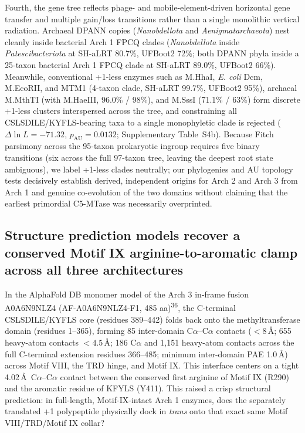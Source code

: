 \documentclass[10pt,letterpaper]{article}
\newcommand{\spname}[1]{\textit{#1}}
\newcommand{\refsup}[1]{\textsuperscript{#1}}
\begin{document}
Fourth, the gene tree reflects phage- and mobile-element-driven horizontal gene transfer and multiple gain/loss transitions rather than a single monolithic vertical radiation. Archaeal DPANN copies (\spname{Nanobdellota} and \spname{Aenigmatarchaeota}) nest cleanly inside bacterial Arch 1 FPCQ clades (\spname{Nanobdellota} inside \spname{Patescibacteriota} at SH-aLRT 80.7\%, UFBoot2 72\%; both DPANN phyla inside a 25-taxon bacterial Arch 1 FPCQ clade at SH-aLRT 89.0\%, UFBoot2 66\%). Meanwhile, conventional +1-less enzymes such as M.HhaI, \spname{E. coli} Dcm, M.EcoRII, and MTM1 (4-taxon clade, SH-aLRT 99.7\%, UFBoot2 95\%), archaeal M.MthTI (with M.HaeIII, 96.0\% / 98\%), and M.SssI (71.1\% / 63\%) form discrete +1-less clusters interspersed across the tree, and constraining all CSLSDILE/KYFLS-bearing taxa to a single monophyletic clade is rejected ($\Delta\ln L = -71.32$, $p_{\mathrm{AU}} = 0.0132$; Supplementary Table~S4b). Because Fitch parsimony across the 95-taxon prokaryotic ingroup requires five binary transitions (six across the full 97-taxon tree, leaving the deepest root state ambiguous), we label +1-less clades neutrally; our phylogenies and AU topology tests decisively establish derived, independent origins for Arch 2 and Arch 3 from Arch 1 and genuine co-evolution of the two domains without claiming that the earliest primordial C5-MTase was necessarily overprinted.

\subsection{Structure prediction models recover a conserved Motif IX arginine-to-aromatic clamp across all three architectures}

In the AlphaFold DB monomer model of the Arch 3 in-frame fusion A0A6N9NLZ4 (AF-A0A6N9NLZ4-F1, 485 aa)\refsup{36}, the C-terminal CSLSDILE/KYFLS core (residues 389--442) folds back onto the methyltransferase domain (residues 1--365), forming 85 inter-domain C$\alpha$--C$\alpha$ contacts ($< 8$\,\AA; 655 heavy-atom contacts $< 4.5$\,\AA; 186 C$\alpha$ and 1,151 heavy-atom contacts across the full C-terminal extension residues 366--485; minimum inter-domain PAE 1.0\,\AA) across Motif VIII, the TRD hinge, and Motif IX. This interface centers on a tight 4.02\,\AA\ C$\alpha$--C$\alpha$ contact between the conserved first arginine of Motif IX (R290) and the aromatic residue of KFYLS (Y411). This raised a crisp structural prediction: in full-length, Motif-IX-intact Arch 1 enzymes, does the separately translated +1 polypeptide physically dock in \textit{trans} onto that exact same Motif VIII/TRD/Motif IX collar?
\end{document}
